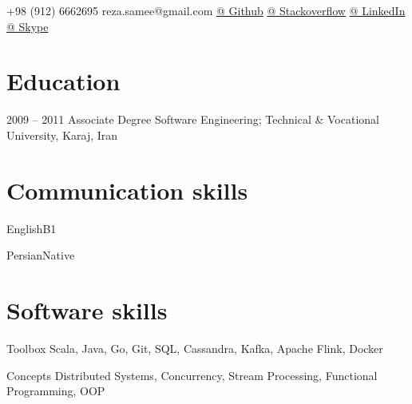 \documentclass{tccv}
\begin{document}
    {+98 (912) 6662695}
	{reza.samee@gmail.com}
	{\href{https://github.com/sameei}{@ Github}}
	{\href{https://stackoverflow.com/users/998642/reza-sameei}{@ Stackoverflow}}
	{\href{http://linkedin.com/in/reza-sameei/}{@ LinkedIn}}
	{\href{https://join.skype.com/invite/nINGOAMPxZdX}{@ Skype}}

\section{Education}

\begin{yearlist}

\item{2009 -- 2011}
     {Associate Degree}
     {Software Engineering; Technical \& Vocational University, Karaj, Iran}

\end{yearlist}


\section{Communication skills}

\begin{factlist}
\item{English}{B1}
\item{Persian}{Native}
\end{factlist}

\section{Software skills}

\begin{factlist}

\item{Toolbox}
     {Scala, Java, Go, Git, SQL, Cassandra, Kafka, Apache Flink, Docker}

\item{Concepts}
     {Distributed Systems, Concurrency, Stream Processing,
     Functional Programming, OOP}

\end{factlist}
\end{document}
